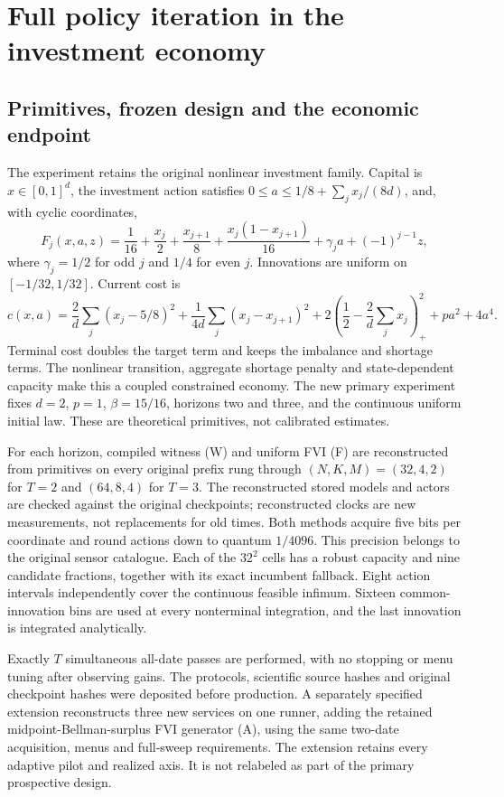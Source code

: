 \section{Full policy iteration in the investment economy}\label{sec:study53}
\subsection{Primitives, frozen design and the economic endpoint}
The experiment retains the original nonlinear investment family. Capital is $x\in[0,1]^d$, the investment action satisfies $0\le a\le1/8+\sum_jx_j/(8d)$, and, with cyclic coordinates,
\begin{equation}\label{eq:investment53}
 F_j(x,a,z)=\frac1{16}+\frac{x_j}{2}+\frac{x_{j+1}}8+
 \frac{x_j(1-x_{j+1})}{16}+\gamma_ja+(-1)^{j-1}z,
\end{equation}
where $\gamma_j=1/2$ for odd $j$ and $1/4$ for even $j$. Innovations are uniform on $[-1/32,1/32]$. Current cost is
\begin{equation}\label{eq:cost53}
 c(x,a)=\frac2d\sum_j(x_j-5/8)^2+\frac1{4d}\sum_j(x_j-x_{j+1})^2+
 2\left(\frac12-\frac2d\sum_jx_j\right)_+^2+pa^2+4a^4.
\end{equation}
Terminal cost doubles the target term and keeps the imbalance and shortage terms. The nonlinear transition, aggregate shortage penalty and state-dependent capacity make this a coupled constrained economy. The new primary experiment fixes $d=2$, $p=1$, $\beta=15/16$, horizons two and three, and the continuous uniform initial law. These are theoretical primitives, not calibrated estimates.

For each horizon, compiled witness (W) and uniform FVI (F) are reconstructed from primitives on every original prefix rung through $(N,K,M)=(32,4,2)$ for $T=2$ and $(64,8,4)$ for $T=3$. The reconstructed stored models and actors are checked against the original checkpoints; reconstructed clocks are new measurements, not replacements for old times. Both methods acquire five bits per coordinate and round actions down to quantum $1/4096$. This precision belongs to the original sensor catalogue. Each of the $32^2$ cells has a robust capacity and nine candidate fractions, together with its exact incumbent fallback. Eight action intervals independently cover the continuous feasible infimum. Sixteen common-innovation bins are used at every nonterminal integration, and the last innovation is integrated analytically.

Exactly $T$ simultaneous all-date passes are performed, with no stopping or menu tuning after observing gains. The protocols, scientific source hashes and original checkpoint hashes were deposited before production. A separately specified extension reconstructs three new services on one runner, adding the retained midpoint-Bellman-surplus FVI generator (A), using the same two-date acquisition, menus and full-sweep requirements. The extension retains every adaptive pilot and realized axis. It is not relabeled as part of the primary prospective design.


